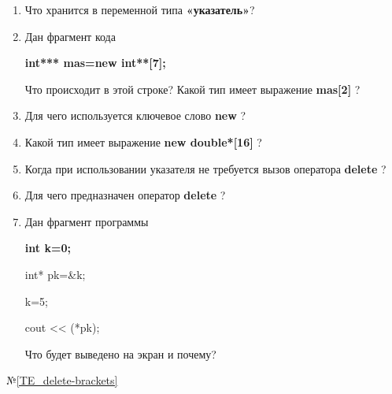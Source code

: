 \begin{enumerate}

	\item Что хранится в переменной типа {\bf  «указатель»}?

	\item Дан фрагмент кода

	{\bf int*** mas=new int**[7];}

	Что происходит в этой строке?
	Какой тип имеет выражение  {\bf mas[2] }?

	\item Для чего используется ключевое слово  {\bf new }?

	\item Какой тип имеет выражение  {\bf new double*[16] }?

	\item  Когда при использовании указателя не требуется вызов оператора {\bf delete} ?

	\item  Для чего предназначен оператор  {\bf delete} ?

	\item Дан фрагмент программы

		    {\bf
		       int k=0;

		       int* pk=\&k;

		       k=5;

		       cout <\!< (*pk);
				}

	Что будет выведено на экран и почему?

\end{enumerate}

\typerrors
№\ref{TE_delete-brackets}
